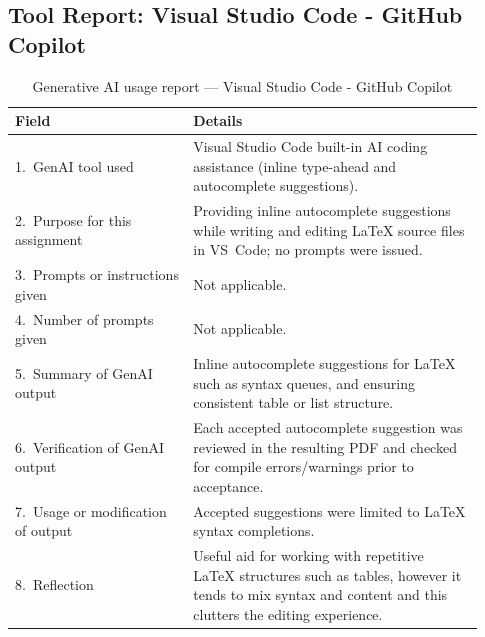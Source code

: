 
\subsection*{Tool Report: Visual Studio Code - GitHub Copilot}

\begin{table}[H]
\renewcommand{\arraystretch}{1.4}
\begin{tabular}{|p{0.35\linewidth}|p{0.58\linewidth}|}
    \hline
    \textbf{Field} & \textbf{Details} \\
    \hline

    1.\ GenAI tool used
    & Visual Studio Code built-in AI coding assistance
      (inline type-ahead and autocomplete suggestions). \\
    \hline

    2.\ Purpose for this assignment
    & Providing inline autocomplete suggestions while
      writing and editing \LaTeX{} source files in
      VS~Code;
      no prompts were issued. \\
    \hline

    3.\ Prompts or instructions given
    & Not applicable. \\
    \hline

    4.\ Number of prompts given
    & Not applicable. \\
    \hline

    5.\ Summary of GenAI output
    & Inline autocomplete suggestions for \LaTeX{} such as syntax queues, and ensuring consistent table or list structure. \\
    \hline

    6.\ Verification of GenAI output
    & Each accepted autocomplete suggestion was reviewed
      in the resulting PDF and checked for compile errors/warnings prior to acceptance.  \\
    \hline

    7.\ Usage or modification of output
    & Accepted suggestions were limited to \LaTeX{} syntax
      completions.
\\
    \hline

    8.\ Reflection
    & Useful aid for working with repetitive \LaTeX{} structures such as
      tables, however it tends to mix syntax and content and this clutters the editing experience. \\
    \hline

\end{tabular}
\caption{Generative AI usage report --- Visual Studio Code - GitHub Copilot}
\end{table}